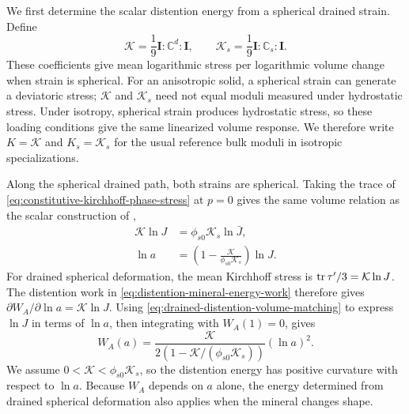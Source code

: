 We first determine the scalar distention energy from a spherical drained
strain. Define
\begin{equation}
 \mathcal{K}=\frac19\mathbf I:\mathbb{C}^d:\mathbf I,\qquad
 \mathcal{K}_s=\frac19\mathbf I:\mathbb{C}_s:\mathbf I.
 \label{eq:spherical-strain-stiffnesses}
\end{equation}
These coefficients give mean logarithmic stress per logarithmic volume
change when strain is spherical. For an anisotropic solid, a spherical
strain can generate a deviatoric stress; \(\mathcal{K}\) and \(\mathcal{K}_s\) need not
equal moduli measured under hydrostatic stress. Under isotropy, spherical
strain produces hydrostatic stress, so these loading conditions give the
same linearized volume response. We therefore write
\(K=\mathcal{K}\) and \(K_s=\mathcal{K}_s\) for the usual reference bulk
moduli in isotropic specializations.

Along the spherical drained path, both strains are spherical. Taking the
trace of \eqref{eq:constitutive-kirchhoff-phase-stress} at \(p=0\)
gives the same volume relation as the scalar construction of
\citet{foster2026poroplastic},
\begin{align}
 \mathcal{K}\ln J&=\phi_{s0}\mathcal{K}_s\ln\bar J,
 \label{eq:drained-mineral-volume-matching}\\
 \ln a&=\left(1-\frac{\mathcal{K}}{\phi_{s0}\mathcal{K}_s}\right)\ln J.
 \label{eq:drained-distention-volume-matching}
\end{align}
For drained spherical deformation, the mean Kirchhoff stress is
\(\operatorname{tr}\mathbf\tau'/3=\mathcal{K}\ln J\). The distention work in
\eqref{eq:distention-mineral-energy-work} therefore gives
\(\partial W_A/\partial\ln a=\mathcal{K}\ln J\).
Using \eqref{eq:drained-distention-volume-matching} to express \(\ln J\)
in terms of \(\ln a\), then integrating with \(W_A(1)=0\), gives
\begin{equation}
 W_A(a)=\frac{\mathcal{K}}{2\left(1-\mathcal{K}/(\phi_{s0}\mathcal{K}_s)\right)}(\ln a)^2.
 \label{eq:distention-energy}
\end{equation}
We assume \(0<\mathcal{K}<\phi_{s0}\mathcal{K}_s\), so the distention energy has positive
curvature with respect to \(\ln a\). Because \(W_A\) depends on \(a\) alone,
the energy determined from drained spherical deformation also applies when
the mineral changes shape.

